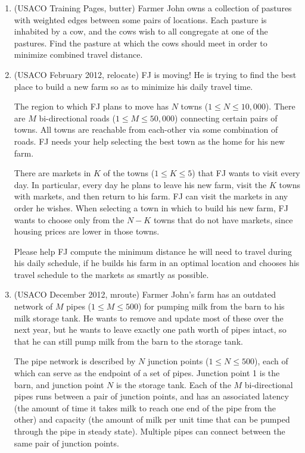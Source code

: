 \documentclass[11pt]{book}
\begin{document}
\begin{enumerate}

\item
(USACO Training Pages, butter)
Farmer John owns a collection of pastures with weighted edges between some
pairs of locations. Each pasture is inhabited by a cow, and the cows wish to all congregate at one of the
pastures. Find the pasture at which the cows should meet in order to minimize combined travel distance.

\item
(USACO February 2012, relocate)
FJ is moving! He is trying to find the best place to build a new farm so as to
minimize his daily travel time.

The region to which FJ plans to move has $N$ towns ($1 \le N \le 10, 000$). There are $M$ bi-directional roads
($1 \le M \le 50, 000$) connecting certain pairs of towns. All towns are reachable from each-other via some
combination of roads. FJ needs your help selecting the best town as the home for his new farm.

There are markets in $K$ of the towns ($1 \le K \le 5$) that FJ wants to visit every day. In particular, every day
he plans to leave his new farm, visit the $K$ towns with markets, and then return to his farm. FJ can visit the
markets in any order he wishes. When selecting a town in which to build his new farm, FJ wants to choose
only from the $N - K$ towns that do not have markets, since housing prices are lower in those towns.

Please help FJ compute the minimum distance he will need to travel during his daily schedule, if he builds his
farm in an optimal location and chooses his travel schedule to the markets as smartly as possible.

\item
(USACO December 2012, mroute)
Farmer John's farm has an outdated network of $M$ pipes ($1 \le M \le 500$) for
pumping milk from the barn to his milk storage tank.  He wants to remove
and update most of these over the next year, but he wants to leave exactly
one path worth of pipes intact, so that he can still pump milk from the
barn to the storage tank.

The pipe network is described by $N$ junction points ($1 \le N \le 500$), each of
which can serve as the endpoint of a set of pipes.  Junction point 1 is the
barn, and junction point $N$ is the storage tank.  Each of the $M$
bi-directional pipes runs between a pair of junction points, and has an
associated latency (the amount of time it takes milk to reach one end of
the pipe from the other) and capacity (the amount of milk per unit time
that can be pumped through the pipe in steady state).  Multiple pipes
can connect between the same pair of junction points.


\end{enumerate}
\end{document}
